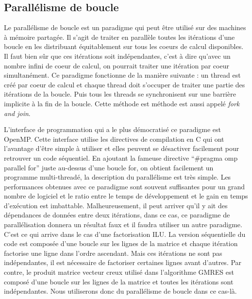 \subsection{Parallélisme de boucle}
Le parallélisme de boucle est un paradigme qui peut être utilisé sur des machines à mémoire partagée.
%
Il s'agit de traiter en parallèle toutes les itérations d'une boucle en les distribuant équitablement sur tous les coeurs de calcul disponibles.
%
Il faut bien sûr que ces itérations soit indépendantes, c'est à dire qu'avec un nombre infini de coeur de calcul, on pourrait traiter une itération par coeur simultanément.
%
Ce paradigme fonctionne de la manière suivante : un thread est créé par coeur de calcul et chaque thread doit s'occuper de traiter une partie des itérations de la boucle.
%
Puis tous les threads se synchronisent sur une barrière implicite à la fin de la boucle.
%
Cette méthode est méthode est aussi appelé {\em fork and join}.


L'interface de programmation qui a le plus démocratisé ce paradigme est OpenMP.
%
Cette interface utilise les directives de compilation en C qui ont l'avantage d'être simple à utiliser et elles peuvent se désactiver facilement pour retrouver un code séquentiel.
%
En ajoutant la fameuse directive ``\#pragma omp parallel for'' juste au-dessus d'une boucle for, on obtient facilement un programme multi-threadé, la description du parallélisme est très simple.
%
Les performances obtenues avec ce paradigme sont souvent suffisantes pour un grand nombre de logiciel et le ratio entre le temps de développement et le gain en temps d'exécution est imbattable.
%
Malheureusement, il peut arriver qu'il y ait des dépendances de données entre deux itérations, dans ce cas, ce paradigme de parallélisation donnera un résultat faux et il faudra utiliser un autre paradigme.
%
C'est ce qui arrive dans le cas d'une factorisation ILU.
%
La version séquentielle du code est composée d'une boucle sur les lignes de la matrice et chaque itération factorise une ligne dans l'ordre ascendant.
%
Mais ces itérations ne sont pas indépendantes, il est nécessaire de factoriser certaines lignes avant d'autres.
%
Par contre, le produit matrice vecteur creux utilisé dans l'algorithme GMRES est composé d'une boucle sur les lignes de la matrice et toutes les itérations sont indépendantes.
%
Nous utiliserons donc du parallélisme de boucle dans ce cas-là.
